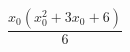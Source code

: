 \documentclass{article}
\begin{document}
\[
\frac{x_{0} \left(x_{0}^{2} + 3 x_{0} + 6\right)}{6}
\]
\end{document}
